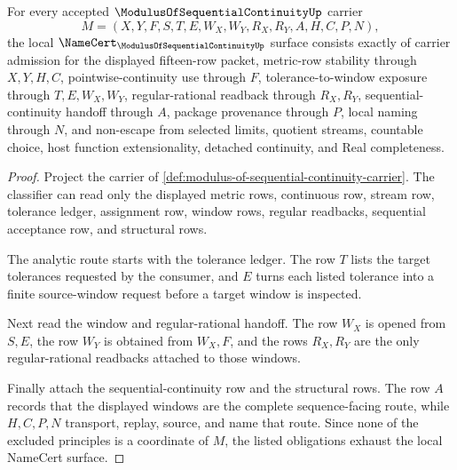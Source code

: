 \begin{theorem}
\label{thm:modulus-of-sequential-continuity-namecert-obligations}
For every accepted $\ModulusOfSequentialContinuityUp$ carrier
$$
M=(X,Y,F,S,T,E,W_X,W_Y,R_X,R_Y,A,H,C,P,N),
$$
the local $\NameCert_{\ModulusOfSequentialContinuityUp}$ surface consists exactly of carrier admission for the displayed fifteen-row packet, metric-row stability through $X,Y,H,C$, pointwise-continuity use through $F$, tolerance-to-window exposure through $T,E,W_X,W_Y$, regular-rational readback through $R_X,R_Y$, sequential-continuity handoff through $A$, package provenance through $P$, local naming through $N$, and non-escape from selected limits, quotient streams, countable choice, host function extensionality, detached continuity, and Real completeness.
\end{theorem}
\begin{proof}
Project the carrier of \autoref{def:modulus-of-sequential-continuity-carrier}. The classifier can read only the displayed metric rows, continuous row, stream row, tolerance ledger, assignment row, window rows, regular readbacks, sequential acceptance row, and structural rows.

The analytic route starts with the tolerance ledger. The row $T$ lists the target tolerances requested by the consumer, and $E$ turns each listed tolerance into a finite source-window request before a target window is inspected.

Next read the window and regular-rational handoff. The row $W_X$ is opened from $S,E$, the row $W_Y$ is obtained from $W_X,F$, and the rows $R_X,R_Y$ are the only regular-rational readbacks attached to those windows.

Finally attach the sequential-continuity row and the structural rows. The row $A$ records that the displayed windows are the complete sequence-facing route, while $H,C,P,N$ transport, replay, source, and name that route. Since none of the excluded principles is a coordinate of $M$, the listed obligations exhaust the local NameCert surface.
\end{proof}

